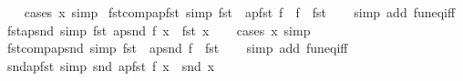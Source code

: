 \begin{isabellebody}
%
\isadelimproof
\ \ %
\endisadelimproof
%
\isatagproof
{}\isamarkupfalse%
\ {\isacharparenleft}{\kern0pt}cases\ x{\isacharparenright}{\kern0pt}\ simp%
\endisatagproof
{\isafoldproof}%
%
\isadelimproof
\isanewline
%
\endisadelimproof
\isanewline
{}\isamarkupfalse%
\ fst{\isacharunderscore}{\kern0pt}comp{\isacharunderscore}{\kern0pt}apfst\ {\isacharbrackleft}{\kern0pt}simp{\isacharbrackright}{\kern0pt}{\isacharcolon}{\kern0pt}\ {\isachardoublequoteopen}fst\ {\isasymcirc}\ apfst\ f\ {\isacharequal}{\kern0pt}\ f\ {\isasymcirc}\ fst{\isachardoublequoteclose}\isanewline
%
\isadelimproof
\ \ %
\endisadelimproof
%
\isatagproof
{}\isamarkupfalse%
\ {\isacharparenleft}{\kern0pt}simp\ add{\isacharcolon}{\kern0pt}\ fun{\isacharunderscore}{\kern0pt}eq{\isacharunderscore}{\kern0pt}iff{\isacharparenright}{\kern0pt}%
\endisatagproof
{\isafoldproof}%
%
\isadelimproof
\isanewline
%
\endisadelimproof
\isanewline
{}\isamarkupfalse%
\ fst{\isacharunderscore}{\kern0pt}apsnd\ {\isacharbrackleft}{\kern0pt}simp{\isacharbrackright}{\kern0pt}{\isacharcolon}{\kern0pt}\ {\isachardoublequoteopen}fst\ {\isacharparenleft}{\kern0pt}apsnd\ f\ x{\isacharparenright}{\kern0pt}\ {\isacharequal}{\kern0pt}\ fst\ x{\isachardoublequoteclose}\isanewline
%
\isadelimproof
\ \ %
\endisadelimproof
%
\isatagproof
{}\isamarkupfalse%
\ {\isacharparenleft}{\kern0pt}cases\ x{\isacharparenright}{\kern0pt}\ simp%
\endisatagproof
{\isafoldproof}%
%
\isadelimproof
\isanewline
%
\endisadelimproof
\isanewline
{}\isamarkupfalse%
\ fst{\isacharunderscore}{\kern0pt}comp{\isacharunderscore}{\kern0pt}apsnd\ {\isacharbrackleft}{\kern0pt}simp{\isacharbrackright}{\kern0pt}{\isacharcolon}{\kern0pt}\ {\isachardoublequoteopen}fst\ {\isasymcirc}\ apsnd\ f\ {\isacharequal}{\kern0pt}\ fst{\isachardoublequoteclose}\isanewline
%
\isadelimproof
\ \ %
\endisadelimproof
%
\isatagproof
{}\isamarkupfalse%
\ {\isacharparenleft}{\kern0pt}simp\ add{\isacharcolon}{\kern0pt}\ fun{\isacharunderscore}{\kern0pt}eq{\isacharunderscore}{\kern0pt}iff{\isacharparenright}{\kern0pt}%
\endisatagproof
{\isafoldproof}%
%
\isadelimproof
\isanewline
%
\endisadelimproof
\isanewline
{}\isamarkupfalse%
\ snd{\isacharunderscore}{\kern0pt}apfst\ {\isacharbrackleft}{\kern0pt}simp{\isacharbrackright}{\kern0pt}{\isacharcolon}{\kern0pt}\ {\isachardoublequoteopen}snd\ {\isacharparenleft}{\kern0pt}apfst\ f\ x{\isacharparenright}{\kern0pt}\ {\isacharequal}{\kern0pt}\ snd\ x{\isachardoublequoteclose}\isanewline
%
\isadelimproof
\ \ %
\endisadelimproof

\end{isabellebody}

